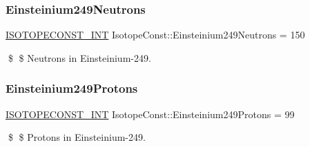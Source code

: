 \subsubsection{\texorpdfstring{Einsteinium249\+Neutrons}{Einsteinium249Neutrons}}
{\footnotesize\ttfamily \mbox{\hyperlink{group___isotope_const-_macros_ga5f18360b3e99483a35c32d789e62621c}{I\+S\+O\+T\+O\+P\+E\+C\+O\+N\+S\+T\+\_\+\+I\+NT}} Isotope\+Const\+::\+Einsteinium249\+Neutrons = 150}

\$ \$ Neutrons in Einsteinium-\/249. \mbox{\label{group___isotope_const-_einsteinium-_es249_ga1790ae6ca11fb33e1fe550e7a386f898}} 
\subsubsection{\texorpdfstring{Einsteinium249\+Protons}{Einsteinium249Protons}}
{\footnotesize\ttfamily \mbox{\hyperlink{group___isotope_const-_macros_ga5f18360b3e99483a35c32d789e62621c}{I\+S\+O\+T\+O\+P\+E\+C\+O\+N\+S\+T\+\_\+\+I\+NT}} Isotope\+Const\+::\+Einsteinium249\+Protons = 99}

\$ \$ Protons in Einsteinium-\/249. 